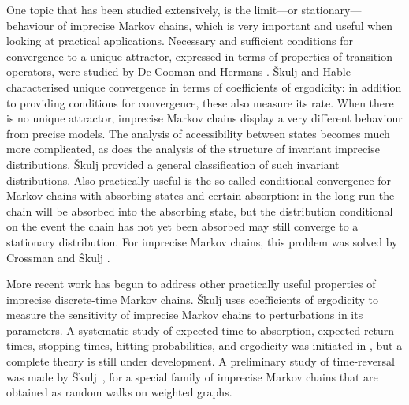 \documentclass[11pt,dvipsnames,usenames,a4paper]{article}
\begin{document}
One topic that has been studied extensively, is the limit---or stationary---behaviour of imprecise Markov chains, which is very important and useful when looking at practical applications.
Necessary and sufficient conditions for convergence to a unique attractor, expressed in terms of properties of transition operators, were studied by De Cooman and Hermans \cite{cooman2008,hermans2012}. %
Škulj and Hable \cite{skulj2013} characterised unique convergence in terms of coefficients of ergodicity: in addition to providing conditions for convergence, these also measure its rate. 
When there is no unique attractor, imprecise Markov chains display a very different behaviour from precise models. 
The analysis of accessibility between states becomes much more complicated, as does the analysis of the structure of invariant imprecise distributions. 
Škulj \cite{skulj:13b} provided a general classification of such invariant distributions. Also practically useful is the so-called conditional convergence for Markov chains with absorbing states and certain absorption: in the long run the chain will be absorbed into the absorbing state, but the distribution conditional on the event the chain has not yet been absorbed may still converge to a stationary distribution. 
For imprecise Markov chains, this problem was solved by Crossman and Škulj \cite{Crossman:2010}.

More recent work has begun to address other practically useful properties of imprecise discrete-time Markov chains.
Škulj \cite{skulj:2016b} uses coefficients of ergodicity to measure the sensitivity of imprecise Markov chains to perturbations in its parameters. 
A systematic study of expected time to absorption, expected return times, stopping times, hitting  probabilities, and ergodicity was initiated in \cite{troffaes:2013, cooman2015:markovergodic}, but a complete theory is still under development. 
A preliminary study of time-reversal  was made by Škulj~\cite{skulj:16}, for a special family of imprecise Markov chains that are obtained as random walks on weighted graphs. 
\end{document}
